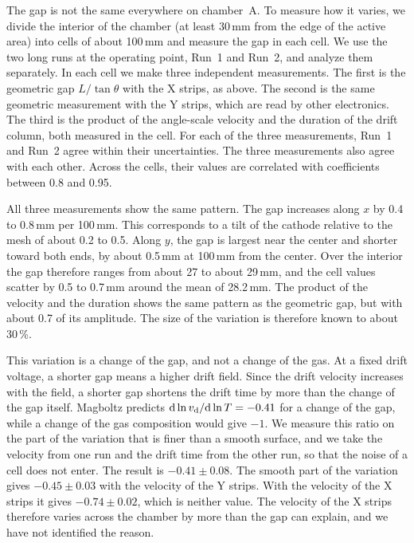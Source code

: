 The gap is not the same everywhere on chamber~A. To measure how it varies, we divide the interior of the chamber (at
least 30\,mm from the edge of the active area) into cells of about 100\,mm and measure the gap in each cell. We use the
two long runs at the operating point, Run~1 and Run~2, and analyze them separately. In each cell we make three
independent measurements. The first is the geometric gap $L/\tan\theta$ with the X strips, as above. The second is the
same geometric measurement with the Y strips, which are read by other electronics. The third is the product of the
angle-scale velocity and the duration of the drift column, both measured in the cell. For each of the three
measurements, Run~1 and Run~2 agree within their uncertainties. The three measurements also agree with each other.
Across the cells, their values are correlated with coefficients between 0.8 and 0.95.

All three measurements show the same pattern. The gap increases along $x$ by 0.4 to 0.8\,mm per 100\,mm. This
corresponds to a tilt of the cathode relative to the mesh of about 0.2 to 0.5\textdegree. Along $y$, the gap is
largest near the center and shorter toward both ends, by about 0.5\,mm at 100\,mm from the center. Over the interior
the gap therefore ranges from about 27 to about 29\,mm, and the cell values scatter by 0.5 to 0.7\,mm around the mean
of 28.2\,mm. The product of the velocity and the duration shows the same pattern as the geometric gap, but with about
0.7 of its amplitude. The size of the variation is therefore known to about 30\,\%.

This variation is a change of the gap, and not a change of the gas. At a fixed drift voltage, a shorter gap means a
higher drift field. Since the drift velocity increases with the field, a shorter gap shortens the drift time by more
than the change of the gap itself. Magboltz predicts $\mathrm{d}\ln v_\mathrm{d}/\mathrm{d}\ln T=-0.41$ for a change of the gap,
while a change of the gas composition would give $-1$. We measure this ratio on the part of the variation that is
finer than a smooth surface, and we take the velocity from one run and the drift time from the other run, so that the
noise of a cell does not enter. The result is $-0.41\pm0.08$. The smooth part of the variation gives $-0.45\pm0.03$
with the velocity of the Y strips. With the velocity of the X strips it gives $-0.74\pm0.02$, which is neither value.
The velocity of the X strips therefore varies across the chamber by more than the gap can explain, and we have not
identified the reason.


